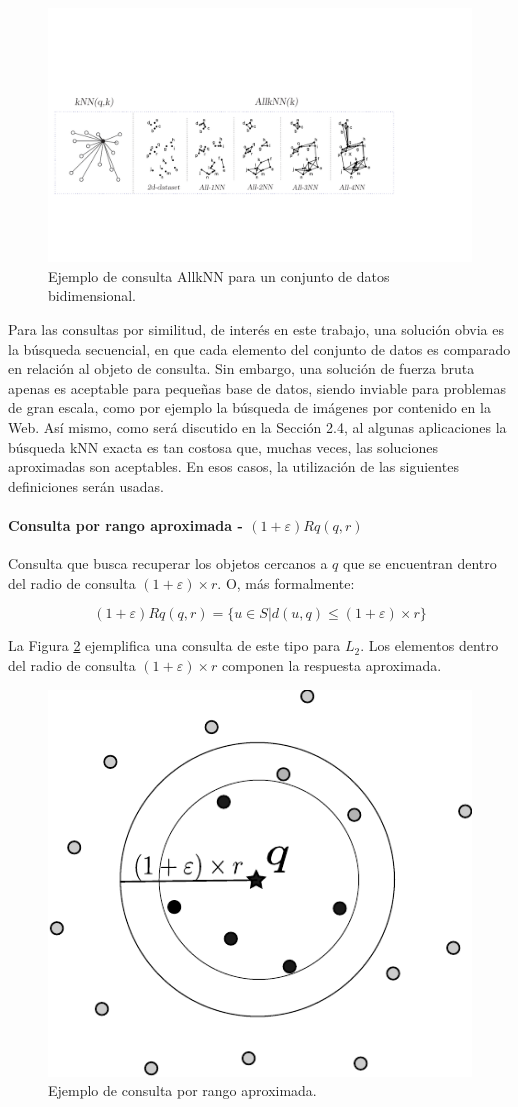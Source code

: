\begin{figure}[ht]
\centering
 \includegraphics[width=0.85\columnwidth]{chapter2/knnGraph.pdf}
\caption{Ejemplo  de consulta AllkNN para un conjunto de datos bidimensional.}
\label{fig:knn_allknn}
\end{figure}

Para las consultas por similitud, de interés en este trabajo, una solución obvia es la búsqueda secuencial, en que cada elemento del conjunto de datos es comparado en relación al objeto de consulta. Sin embargo, una solución de fuerza bruta apenas es aceptable para pequeñas base de datos, siendo inviable para problemas de gran escala, como por ejemplo la búsqueda de imágenes por contenido en la Web. Así mismo, como será discutido en la Sección 2.4, al algunas aplicaciones la búsqueda kNN exacta es tan costosa que, muchas veces, las soluciones aproximadas son aceptables. En esos casos, la utilización de las siguientes definiciones serán usadas.


\paragraph{Consulta por rango aproximada - $(1 + \varepsilon)  Rq(q, r)$}

Consulta que busca recuperar los objetos cercanos a $q$ que se encuentran dentro del radio de consulta  $(1 + \varepsilon) \times r$. O, más formalmente:

\begin{equation}
    (1 + \varepsilon) Rq(q, r) = \{ u \in S | d(u, q) \leq (1 + \varepsilon) \times r \}
\end{equation}

La Figura \ref{fig:AproximateRangeQuery} ejemplifica una consulta de este tipo para $L_2$. Los elementos dentro del radio de consulta  $(1 + \varepsilon)\times r$ componen la respuesta aproximada.
\begin{figure}[htp]
\centering
\includegraphics[width=0.32\columnwidth]{chapter2/app-range_query.pdf}
\caption{Ejemplo de consulta  por  rango aproximada.}
\label{fig:AproximateRangeQuery}
\end{figure}


